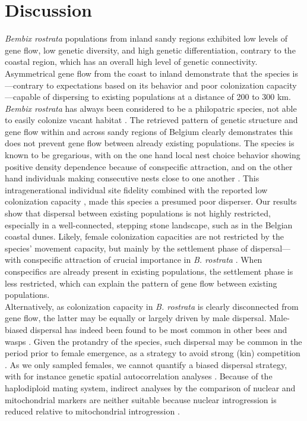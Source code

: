 \documentclass[10pt, twoside]{book} %
\begin{document}
	\section{Discussion}
	\textit{Bembix rostrata} populations from inland sandy regions exhibited low levels of gene flow, low genetic diversity, and high genetic differentiation, contrary to the coastal region, which has an overall high level of genetic connectivity. Asymmetrical gene flow from the coast to inland demonstrate that the species is---contrary to expectations based on its behavior and poor colonization capacity---capable of dispersing to existing populations at a distance of 200 to 300 km.\\
	
	\textit{Bembix rostrata} has always been considered to be a philopatric species, not able to easily colonize vacant habitat \citep{nielsen1945, larsson1986}. The retrieved pattern of genetic structure and gene flow within and across sandy regions of Belgium clearly demonstrates this does not prevent gene flow between already existing populations. The species is known to be gregarious, with on the one hand local nest choice behavior showing positive density dependence because of conspecific attraction, and on the other hand individuals making consecutive nests close to one another \citep[chapter \ref{chapter2}]{larsson1986, batsleer2022}. This intragenerational individual site fidelity combined with the reported low colonization capacity \citep{nielsen1945, bogusch2021}, made this species a presumed poor disperser. Our results show that dispersal between existing populations is not highly restricted, especially in a well-connected, stepping stone landscape, such as in the Belgian coastal dunes. Likely, female colonization capacities are not restricted by the species' movement capacity, but mainly by the settlement phase of dispersal---with conspecific attraction of crucial importance in \textit{B. rostrata} \citep[chapter \ref{chapter2}]{batsleer2022}. When conspecifics are already present in existing populations, the settlement phase is less restricted, which can explain the pattern of gene flow between existing populations.\\
	
	Alternatively, as colonization capacity in \textit{B. rostrata} is clearly disconnected from gene flow, the latter may be equally or largely driven by male dispersal. Male-biased dispersal has indeed been found to be most common in other bees and wasps \citep{johnstone2012}. Given the protandry of the species, such dispersal may be common in the period prior to female emergence, as a strategy to avoid strong (kin) competition \citep{bonte2012, baguette2013}. As we only sampled females, we cannot quantify a biased dispersal strategy, with for instance genetic spatial autocorrelation analyses \citep{banks2012}. Because of the haplodiploid mating system, indirect analyses by the comparison of nuclear and mitochondrial markers are neither suitable because nuclear introgression is reduced relative to mitochondrial introgression \citep{patten2015}.\\
	
\end{document}
